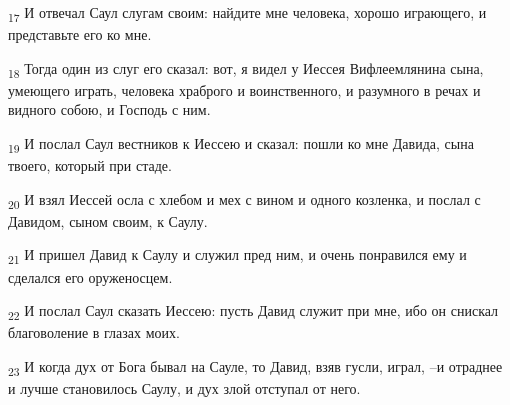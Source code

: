 \begin{tcolorbox}
\textsubscript{17} И отвечал Саул слугам своим: найдите мне человека, хорошо играющего, и представьте его ко мне.
\end{tcolorbox}
\begin{tcolorbox}
\textsubscript{18} Тогда один из слуг его сказал: вот, я видел у Иессея Вифлеемлянина сына, умеющего играть, человека храброго и воинственного, и разумного в речах и видного собою, и Господь с ним.
\end{tcolorbox}
\begin{tcolorbox}
\textsubscript{19} И послал Саул вестников к Иессею и сказал: пошли ко мне Давида, сына твоего, который при стаде.
\end{tcolorbox}
\begin{tcolorbox}
\textsubscript{20} И взял Иессей осла с хлебом и мех с вином и одного козленка, и послал с Давидом, сыном своим, к Саулу.
\end{tcolorbox}
\begin{tcolorbox}
\textsubscript{21} И пришел Давид к Саулу и служил пред ним, и очень понравился ему и сделался его оруженосцем.
\end{tcolorbox}
\begin{tcolorbox}
\textsubscript{22} И послал Саул сказать Иессею: пусть Давид служит при мне, ибо он снискал благоволение в глазах моих.
\end{tcolorbox}
\begin{tcolorbox}
\textsubscript{23} И когда дух от Бога бывал на Сауле, то Давид, взяв гусли, играл, --и отраднее и лучше становилось Саулу, и дух злой отступал от него.
\end{tcolorbox}
